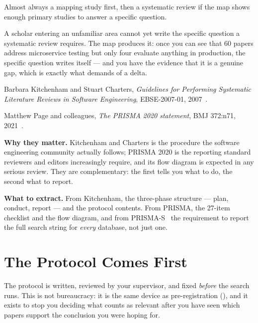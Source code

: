 \begin{conceptbox}
Almost always a mapping study first, then a systematic review if the map shows
enough primary studies to answer a specific question.

\medskip
A scholar entering an unfamiliar area cannot yet write the specific question a
systematic review requires. The map produces it: once you can see that 60
papers address microservice testing but only four evaluate anything in
production, the specific question writes itself --- and you have the evidence
that it is a genuine gap, which is exactly what  demands of
a delta.
\end{conceptbox}

\begin{paperbox}
Barbara Kitchenham and Stuart Charters, \emph{Guidelines for Performing
Systematic Literature Reviews in Software Engineering}, EBSE-2007-01,
2007~\cite{kitchenham2007guidelines}.\oa{}

\medskip
Matthew Page and colleagues, \emph{The PRISMA 2020 statement}, BMJ 372:n71,
2021~\cite{page2021prisma}.\oa{}

\medskip
\textbf{Why they matter.} Kitchenham and Charters is the procedure the software
engineering community actually follows; PRISMA 2020 is the reporting standard
reviewers and editors increasingly require, and its flow diagram is expected in
any serious review. They are complementary: the first tells you what to do, the
second what to report.

\medskip
\textbf{What to extract.} From Kitchenham, the three-phase structure --- plan,
conduct, report --- and the protocol contents. From PRISMA, the 27-item
checklist and the flow diagram, and from PRISMA-S~\cite{rethlefsen2021prisma}
the requirement to report the full search string for \emph{every} database, not
just one.
\end{paperbox}

\section{The Protocol Comes First}

The protocol is written, reviewed by your supervisor, and fixed \emph{before}
the search runs. This is not bureaucracy: it is the same device as
pre-registration (), and it exists to stop you deciding what
counts as relevant after you have seen which papers support the conclusion you
were hoping for.

